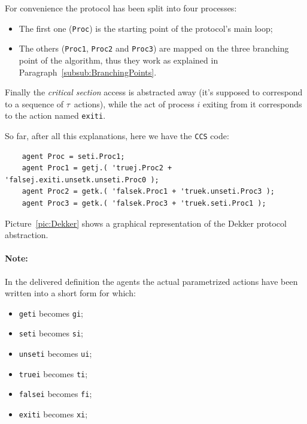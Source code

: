 \documentclass[10pt,a4paper]{article}
\newcommand{\Note}[1]{\paragraph{Note:}{#1}}
\newcommand{\CCS}{{\tt CCS}}
\newcommand{\CCSCode}[1]{{\tt #1}}
\newcommand{\Agent}[1]{{\tt {#1}}}
\begin{document}
            For convenience the protocol has been split into four
            processes:
            \begin{itemize}
            \item   The first one (\Agent{Proc}) is the starting point of
                    the protocol's main loop;
            \item   The others (\Agent{Proc1}, \Agent{Proc2} and
                    \Agent{Proc3}) are mapped on the three branching point
                    of the algorithm, thus they work as explained in
                    Paragraph~\ref{subsub:BranchingPoints}.
            \end{itemize}

            Finally the \emph{critical section} access is abstracted away
            (it's supposed to correspond to a sequence of $\tau$~actions),
            while the act of process $i$ exiting from it corresponds to
            the action named \CCSCode{exiti}.

            So far, after all this explanations, here we have the \CCS{}
            code:
            \begin{verbatim}
    agent Proc = seti.Proc1;
    agent Proc1 = getj.( 'truej.Proc2 + 'falsej.exiti.unsetk.unseti.Proc0 );
    agent Proc2 = getk.( 'falsek.Proc1 + 'truek.unseti.Proc3 );
    agent Proc3 = getk.( 'falsek.Proc3 + 'truek.seti.Proc1 );
            \end{verbatim}

            Picture~\ref{pic:Dekker} shows a graphical representation of the
            Dekker protocol abstraction.

            \Note{
                In the delivered definition the agents the actual
                parametrized actions have been written into a short form
                for which:
                \begin{multicols}{2}
                    \begin{itemize}
                    \item   \CCSCode{geti} becomes \CCSCode{gi};
                    \item   \CCSCode{seti} becomes \CCSCode{si};
                    \item   \CCSCode{unseti} becomes \CCSCode{ui};
                    \item   \CCSCode{truei} becomes \CCSCode{ti};
                    \item   \CCSCode{falsei} becomes \CCSCode{fi};
                    \item   \CCSCode{exiti} becomes \CCSCode{xi};
                    \end{itemize}
                \end{multicols}
            }
\end{document}

